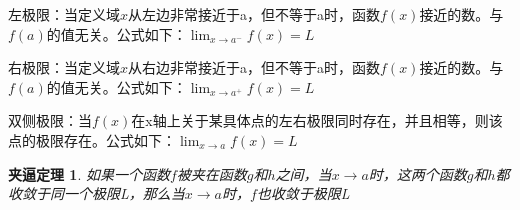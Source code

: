 \documentclass[UTF8,fontset=ubuntu]{ctexart}
\begin{document}
\par
左极限：当定义域$x$从左边非常接近于a，但不等于a时，函数$f(x)$接近的数。与$f(a)$的值无关。公式如下：$\lim_{x\to a^-}f(x)=L$

右极限：当定义域$x$从右边非常接近于a，但不等于a时，函数$f(x)$接近的数。与$f(a)$的值无关。公式如下：$\lim_{x\to a^+}f(x)=L$

双侧极限：当$f(x)$在x轴上关于某具体点的左右极限同时存在，并且相等，则该点的极限存在。公式如下：$\lim_{x\to a}f(x)=L$

\theoremstyle{nonumberplain}
\newtheorem{theorem}{夹逼定理}
\begin{theorem}
	如果一个函数$f$被夹在函数$g$和$h$之间，当$x\rightarrow a$时，这两个函数$g$和$h$都收敛于同一个极限L，那么当$x\rightarrow a$时，$f$也收敛于极限L
\end{theorem}
\end{document}
